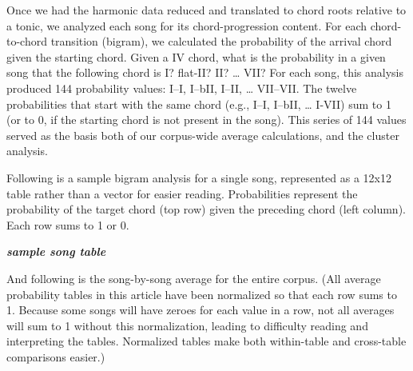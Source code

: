 Once we had the harmonic data reduced and translated to chord roots relative to a tonic, we analyzed each song for its chord-progression content. For each chord-to-chord transition (bigram), we calculated the probability of the arrival chord given the starting chord. Given a IV chord, what is the probability in a given song that the following chord is I? flat-II? II? {\ldots} VII? For each song, this analysis produced 144 probability values: I–I, I–bII, I–II, {\ldots} VII–VII. The twelve probabilities that start with the same chord (e.g., I–I, I–bII, {\ldots} I-VII) sum to 1 (or to 0, if the starting chord is not present in the song). This series of 144 values served as the basis both of our corpus-wide average calculations, and the cluster analysis.

Following is a sample bigram analysis for a single song, represented as a 12x12 table rather than a vector for easier reading. Probabilities represent the probability of the target chord (top row) given the preceding chord (left column). Each row sums to 1 or 0.

\textbf{\emph{sample song table}}

And following is the song-by-song average for the entire corpus. (All average probability tables in this article have been normalized so that each row sums to 1. Because some songs will have zeroes for each value in a row, not all averages will sum to 1 without this normalization, leading to difficulty reading and interpreting the tables. Normalized tables make both within-table and cross-table comparisons easier.)

